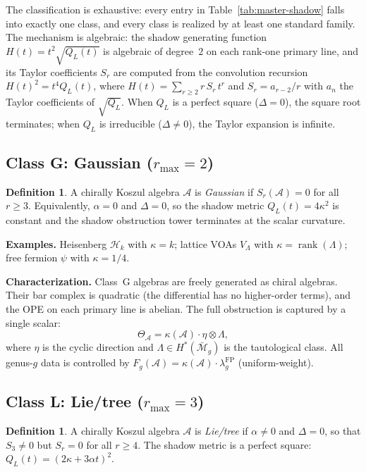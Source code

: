 \documentclass[11pt]{article}
\theoremstyle{plain}
\theoremstyle{definition}
\newtheorem{definition}[theorem]{Definition}
\theoremstyle{remark}
\providecommand{\cA}{\mathcal{A}}
\providecommand{\cH}{\mathcal{H}}
\providecommand{\cM}{\mathcal{M}}
\begin{document}
The classification is exhaustive: every entry in Table~\ref{tab:master-shadow}
falls into exactly one class, and every class is realized by at least
one standard family. The mechanism is algebraic: the shadow generating
function $H(t) = t^2\sqrt{Q_L(t)}$ is algebraic of degree~$2$
on each rank-one primary line, and its Taylor coefficients $S_r$
are computed from the convolution recursion
$H(t)^2 = t^4 Q_L(t)$, where $H(t) = \sum_{r \geq 2} r\, S_r\, t^r$
and $S_r = a_{r-2}/r$ with $a_n$ the Taylor coefficients of $\sqrt{Q_L}$.
When $Q_L$ is a perfect square ($\Delta = 0$), the square root
terminates; when $Q_L$ is irreducible ($\Delta \neq 0$), the Taylor
expansion is infinite.

\medskip

\subsection{Class G: Gaussian ($r_{\max} = 2$)}

\begin{definition}\label{def:class-G}
A chirally Koszul algebra $\cA$ is \emph{Gaussian} if
$S_r(\cA) = 0$ for all $r \geq 3$. Equivalently,
$\alpha = 0$ and $\Delta = 0$, so the shadow metric
$Q_L(t) = 4\kappa^2$ is constant and the shadow obstruction tower
terminates at the scalar curvature.
\end{definition}

\noindent\textbf{Examples.} Heisenberg $\cH_k$ with $\kappa = k$;
lattice VOAs $V_\Lambda$ with $\kappa = \operatorname{rank}(\Lambda)$;
free fermion $\psi$ with $\kappa = 1/4$.

\noindent\textbf{Characterization.}
Class~G algebras are freely generated as chiral algebras. Their bar
complex is quadratic (the differential has no higher-order terms),
and the OPE on each primary line is abelian. The full obstruction
is captured by a single scalar:
\[
\Theta_\cA = \kappa(\cA) \cdot \eta \otimes \Lambda,
\]
where $\eta$ is the cyclic direction and $\Lambda \in H^*(\bar{\cM}_g)$
is the tautological class. All genus-$g$ data is controlled by
$F_g(\cA) = \kappa(\cA) \cdot \lambda_g^{\mathrm{FP}}$ (uniform-weight).

\medskip

\subsection{Class L: Lie/tree ($r_{\max} = 3$)}

\begin{definition}\label{def:class-L}
A chirally Koszul algebra $\cA$ is \emph{Lie/tree} if
$\alpha \neq 0$ and $\Delta = 0$, so that $S_3 \neq 0$
but $S_r = 0$ for all $r \geq 4$. The shadow metric is
a perfect square:
$Q_L(t) = (2\kappa + 3\alpha t)^2$.
\end{definition}
\end{document}

